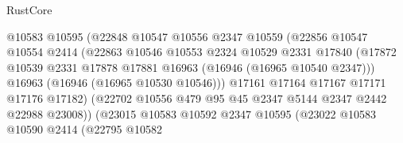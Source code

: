 \begin{lexlean}{RustCore}
\begin{coremodule}
                                    @10583
                                    @10595
                                    (@22848
                                      @10547
                                      @10556
                                      @2347
                                      @10559
                                      (@22856
                                        @10547
                                        @10554
                                        @2414
                                        (@22863
                                          @10546
                                          @10553
                                          @2324
                                          @10529
                                          @2331
                                          @17840
                                          (@17872
                                            @10539
                                            @2331
                                            @17878
                                            @17881
                                            @16963
                                            (@16946 (@16965 @10540 @2347)))
                                          @16963
                                          (@16946 (@16965 @10530 @10546)))
                                        @17161
                                        @17164
                                        @17167
                                        @17171
                                        @17176
                                        @17182)
                                      (@22702
                                        @10556
                                        @479
                                        @95
                                        @45
                                        @2347
                                        @5144
                                        @2347
                                        @2442
                                        @22988
                                        @23008))
                                    (@23015
                                      @10583
                                      @10592
                                      @2347
                                      @10595
                                      (@23022
                                        @10583
                                        @10590
                                        @2414
                                        (@22795
                                          @10582

\end{coremodule}
\end{lexlean}

